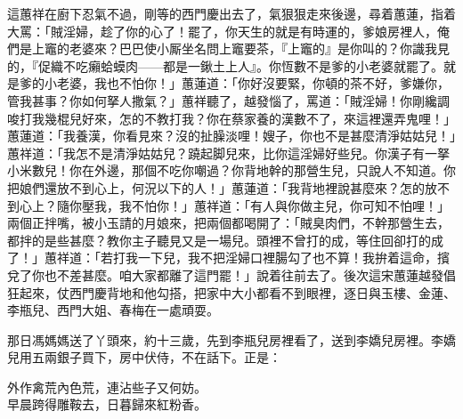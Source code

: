 這蕙祥在廚下忍氣不過，剛等的西門慶出去了，氣狠狠走來後邊，尋着蕙蓮，指着大罵：「賊淫婦，趁了你的心了！罷了，你天生的就是有時運的，爹娘房裡人，俺們是上竈的老婆來？巴巴使小厮坐名問上竈要茶，『上竈的』是你叫的？你識我見的，『促織不吃癩蛤蟆肉——都是一鍬土上人』。你恆數不是爹的小老婆就罷了。就是爹的小老婆，我也不怕你！」蕙蓮道：「你好沒要緊，你頓的茶不好，爹嫌你，管我甚事？你如何拏人撒氣？」蕙祥聽了，越發惱了，罵道：「賊淫婦！你剛纔調唆打我幾棍兒好來，怎的不教打我？你在蔡家養的漢數不了，來這裡還弄鬼哩！」蕙蓮道：「我養漢，你看見來？沒的扯臊淡哩！嫂子，你也不是甚麼清淨姑姑兒！」{}蕙祥道：「我怎不是清淨姑姑兒？蹺起脚兒來，比你這淫婦好些兒。{}你漢子有一拏小米數兒！你在外邊，那個不吃你嘲過？你背地幹的那營生兒，只說人不知道。你把娘們還放不到心上，何況以下的人！」{}蕙蓮道：「我背地裡說甚麼來？怎的放不到心上？隨你壓我，我不怕你！」蕙祥道：「有人與你做主兒，你可知不怕哩！」兩個正拌嘴，被小玉請的月娘來，把兩個都喝開了：「賊臭肉們，不幹那營生去，都拌的是些甚麼？教你主子聽見又是一場兒。頭裡不曾打的成，等住回卻打的成了！」蕙祥道：「若打我一下兒，我不把淫婦口裡腸勾了也不算！我拚着這命，擯兌了你也不差甚麼。咱大家都離了這門罷！」說着往前去了。後次這宋蕙蓮越發倡狂起來，仗西門慶背地和他勾搭，把家中大小都看不到眼裡，逐日與玉樓、金蓮、李瓶兒、西門大姐、春梅在一處頑耍。

那日馮媽媽送了丫頭來，約十三歲，先到李瓶兒房裡看了，送到李嬌兒房裡。李嬌兒用五兩銀子買下，房中伏侍，不在話下。正是：

\begin{myquote} 
外作禽荒內色荒，連沾些子又何妨。\\早晨跨得雕鞍去，日暮歸來紅粉香。
\end{myquote} 

